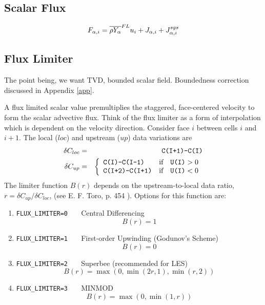 \documentclass[11pt]{article}
\begin{document}
\subsection{Scalar Flux}

\begin{equation}
\label{eqn_flux}
F_{\alpha,i} = \overline{\rho Y_\alpha}^{\tiny FL} u_i + J_{\alpha,i} + J_{\alpha,i}^{sgs}
\end{equation}

\subsection{Flux Limiter}

The point being, we want TVD, bounded scalar field.  Boundedness correction discussed in Appendix \ref{app}.

A flux limited scalar value premultiplies the staggered, face-centered velocity to form the scalar advective flux.  Think of the flux limiter as a form of interpolation which is dependent on the velocity direction. Consider face $i$ between cells $i$ and $i+1$.  The local ($loc$) and upstream ($up$) data variations are
\begin{eqnarray}
\delta C_{loc} &=& \mbox{\tt C(I+1)-C(I)} \nonumber\\
\delta C_{up}  &=& \left\{ \begin{array}{ll} \mbox{\tt C(I)-C(I-1)} & \mbox{if} \quad \mbox{\tt U(I)}>0 \\ \mbox{\tt C(I+2)-C(I+1)} & \mbox{if} \quad \mbox{\tt U(I)}<0 \end{array} \right. \nonumber
\end{eqnarray}
The limiter function $B(r)$ depends on the upstream-to-local data ratio, $r=\delta C_{up}/\delta C_{loc}$, (see E. F. Toro, p. 454 \cite{Toro}).  Options for this function are:
\begin{enumerate}
\item[]{\tt FLUX\_LIMITER=0\,\,\,} Central Differencing  \begin{equation} B(r) = 1 \end{equation}
\item[]{\tt FLUX\_LIMITER=1\,\,\,} First-order Upwinding (Godunov's Scheme) \begin{equation} B(r) = 0 \end{equation}
\item[]{\tt FLUX\_LIMITER=2\,\,\,} Superbee (recommended for LES) \begin{equation} B(r) = \max(0,\min(2r,1),\min(r,2)) \end{equation}
\item[]{\tt FLUX\_LIMITER=3\,\,\,} MINMOD \begin{equation} B(r) = \max(0,\min(1,r)) \end{equation}
\end{enumerate}
\end{document}
